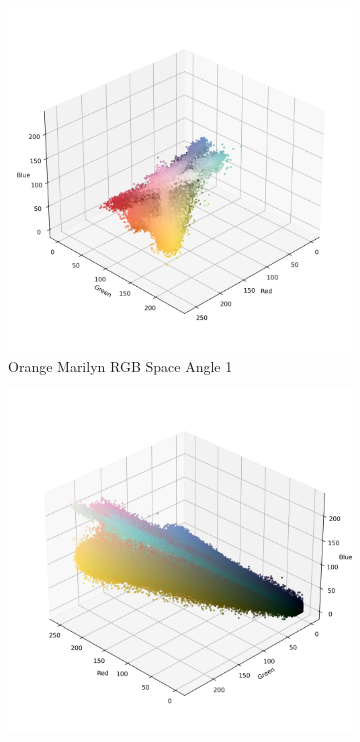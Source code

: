 \documentclass{article}
\begin{document}
\begin{figure}[ht]
  \centering
  \begin{subfigure}{0.24\textwidth}
    \includegraphics[width=\textwidth]{main_files/figure-latex/4_1_orange_marilyn_original_scatter.jpg}
    \caption{Orange Marilyn RGB Space Angle 1}
    \label{fig:4_1_orange_marilyn_original_scatter}
  \end{subfigure}
  \hfill
  \begin{subfigure}{0.24\textwidth}
    \includegraphics[width=\textwidth]{main_files/figure-latex/4_2_orange_marilyn_original_scatter.jpg}

\end{subfigure}
\end{figure}
\end{document}
